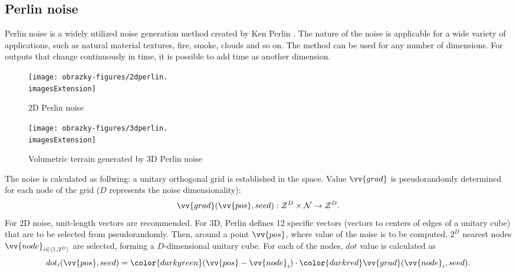 \subsection{Perlin noise}
Perlin noise is a widely utilized noise generation method created by Ken Perlin \cite{Perlin:1985:IS:325165.325247,PerlinKen2002In}. The nature of the noise is applicable for a wide variety of applications, such as natural material textures, fire, smoke, clouds and so on. The method can be used for any number of dimensions. For outputs that change continuously in time, it is possible to add time as another dimension.

\begin{figure}[H]
	\centering
	\begin{minipage}[t]{0.48\textwidth}
		\centering
		\texttt{[image: obrazky-figures/2dperlin.\\imagesExtension]}
		\caption{2D Perlin noise}
	\end{minipage}
	\hfill
	\begin{minipage}[t]{0.48\textwidth}
		\centering
		\texttt{[image: obrazky-figures/3dperlin.\\imagesExtension]}
		\caption{Volumetric terrain generated by 3D Perlin noise}
	\end{minipage}
\end{figure}

The noise is calculated as follwing: a unitary orthogonal grid is established in the space. Value  $\vv{grad}$ is pseudorandomly determined for each node of the grid ($D$ represents the noise dimensionality):
\begin{equation}
	\vv{grad}(\vv{pos}, seed): \mathcal{Z}^D \times \mathcal{N} \rightarrow \mathcal{Z}^D \text{.}
\end{equation}
For 2D noise, unit-length vectors are recommended. For 3D, Perlin defines 12 specific vectors (vectors to centers of edges of a unitary cube) that are to be selected from pseudorandomly. Then, around a point $\vv{pos}$, where value of the noise is to be computed, $2^D$ nearest nodes $\vv{node}_{i \in \langle1, 2^D\rangle}$ are selected, forming a $D$-dimensional unitary cube. For each of the nodes, $dot$ value is calculated as
\begin{equation}
dot_i(\vv{pos}, seed) = \mathbin{\color{darkgreen}(\vv{pos} - \vv{node}_i)} \cdot \mathbin{\color{darkred}\vv{grad}(\vv{node}_i, seed)} \text{.}
\end{equation}

